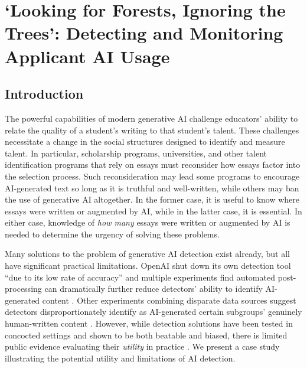 

\chapter{\label{ch:studentuse}`Looking for Forests, Ignoring the Trees': Detecting and Monitoring Applicant AI Usage}

\minitoc

\section{Introduction}\label{sec:intro}
The powerful capabilities of modern generative AI challenge educators' ability to relate the quality of a student's writing to that student's talent. These challenges necessitate a change in the social structures designed to identify and measure talent. In particular, scholarship programs, universities, and other talent identification programs that rely on essays must reconsider how essays factor into the selection process. Such reconsideration may lead some programs to encourage AI-generated text so long as it is truthful and well-written, while others may ban the use of generative AI altogether. In the former case, it is useful to know where essays were written or augmented by AI, while in the latter case, it is essential. In either case, knowledge of \textit{how many} essays were written or augmented by AI is needed to determine the urgency of solving these problems.

Many solutions to the problem of generative AI detection exist already, but all have significant practical limitations. OpenAI shut down its own detection tool ``due to its low rate of accuracy''  and multiple experiments find automated post-processing can dramatically further reduce detectors' ability to identify AI-generated content  \cite{kalpesh_krishna_paraphrasing_2023,vinu_sankar_sadasivan_can_2023,kirchner_new_2023}. Other experiments combining disparate data sources suggest detectors disproportionately identify as AI-generated certain subgroups' genuinely human-written content \cite{liang_gpt_2023}. However, while detection solutions have been tested in concocted settings and shown to be both beatable and biased, there is limited public evidence evaluating their \textit{utility} in practice \cite{liang_gpt_2023,kalpesh_krishna_paraphrasing_2023}. We present a case study illustrating the potential utility and limitations of AI detection. 

